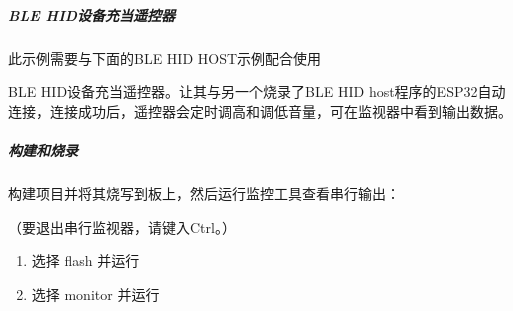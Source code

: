 \documentclass[a4paper,12pt,english]{sphinxmanual}
\begin{document}
{{\subparagraph{BLE HID设备充当遥控器}
\label{\detokenize{exp-esp32/bluetooth/hid-gap:ble-hid}}
\sphinxAtStartPar
此示例需要与下面的BLE HID HOST示例配合使用

\sphinxAtStartPar
BLE HID设备充当遥控器。让其与另一个烧录了BLE HID host程序的ESP32自动连接，连接成功后，遥控器会定时调高和调低音量，可在监视器中看到输出数据。


\subparagraph{构建和烧录}
\label{\detokenize{exp-esp32/bluetooth/hid-gap:id2}}
\sphinxAtStartPar
构建项目并将其烧写到板上，然后运行监控工具查看串行输出：

\sphinxAtStartPar
{}

\sphinxAtStartPar
{}

\sphinxAtStartPar
（要退出串行监视器，请键入Ctrl\sphinxhyphen{}{]}。）

\sphinxAtStartPar
{}
\begin{enumerate}
%
\item {} 
\sphinxAtStartPar
选择 flash 并运行

\item {} 
\sphinxAtStartPar
选择 monitor 并运行

\end{enumerate}


}}
\end{document}
